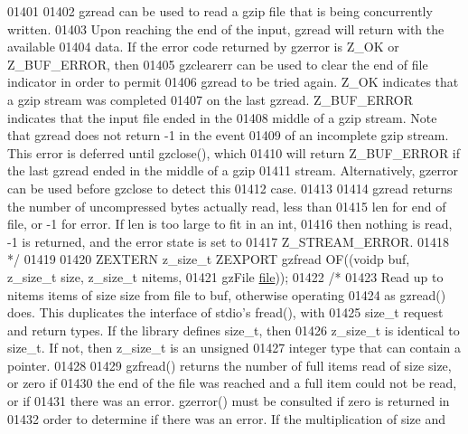 \begin{DoxyCode}
01401 \textcolor{comment}{}
01402 \textcolor{comment}{     gzread can be used to read a gzip file that is being concurrently written.}
01403 \textcolor{comment}{   Upon reaching the end of the input, gzread will return with the available}
01404 \textcolor{comment}{   data.  If the error code returned by gzerror is Z\_OK or Z\_BUF\_ERROR, then}
01405 \textcolor{comment}{   gzclearerr can be used to clear the end of file indicator in order to permit}
01406 \textcolor{comment}{   gzread to be tried again.  Z\_OK indicates that a gzip stream was completed}
01407 \textcolor{comment}{   on the last gzread.  Z\_BUF\_ERROR indicates that the input file ended in the}
01408 \textcolor{comment}{   middle of a gzip stream.  Note that gzread does not return -1 in the event}
01409 \textcolor{comment}{   of an incomplete gzip stream.  This error is deferred until gzclose(), which}
01410 \textcolor{comment}{   will return Z\_BUF\_ERROR if the last gzread ended in the middle of a gzip}
01411 \textcolor{comment}{   stream.  Alternatively, gzerror can be used before gzclose to detect this}
01412 \textcolor{comment}{   case.}
01413 \textcolor{comment}{}
01414 \textcolor{comment}{     gzread returns the number of uncompressed bytes actually read, less than}
01415 \textcolor{comment}{   len for end of file, or -1 for error.  If len is too large to fit in an int,}
01416 \textcolor{comment}{   then nothing is read, -1 is returned, and the error state is set to}
01417 \textcolor{comment}{   Z\_STREAM\_ERROR.}
01418 \textcolor{comment}{*/}
01419 
01420 ZEXTERN z\_size\_t ZEXPORT gzfread OF((voidp buf, z\_size\_t size, z\_size\_t nitems,
01421                                      gzFile \hyperlink{structfile}{file}));
01422 \textcolor{comment}{/*}
01423 \textcolor{comment}{     Read up to nitems items of size size from file to buf, otherwise operating}
01424 \textcolor{comment}{   as gzread() does.  This duplicates the interface of stdio's fread(), with}
01425 \textcolor{comment}{   size\_t request and return types.  If the library defines size\_t, then}
01426 \textcolor{comment}{   z\_size\_t is identical to size\_t.  If not, then z\_size\_t is an unsigned}
01427 \textcolor{comment}{   integer type that can contain a pointer.}
01428 \textcolor{comment}{}
01429 \textcolor{comment}{     gzfread() returns the number of full items read of size size, or zero if}
01430 \textcolor{comment}{   the end of the file was reached and a full item could not be read, or if}
01431 \textcolor{comment}{   there was an error.  gzerror() must be consulted if zero is returned in}
01432 \textcolor{comment}{   order to determine if there was an error.  If the multiplication of size and}

\end{DoxyCode}
